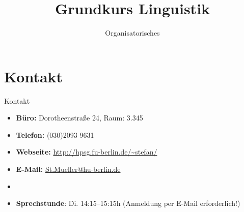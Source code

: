 
\title{Grundkurs Linguistik}

\subtitle{Organisatorisches}



\date{ }





\huberlintitlepage

	

\section{Kontakt}
%

\begin{frame}{Kontakt}

\begin{itemize}
	\item \textbf{Büro:} Dorotheenstraße 24, Raum: 3.345
	\item \textbf{Telefon:} (030)2093-9631
	\item \textbf{Webseite:} \url{http://hpsg.fu-berlin.de/~stefan/}
	\item \textbf{E-Mail:} \href{mailto:St.Mueller@hu-berlin.de}{St.Mueller@hu-berlin.de}
	\item[]
	\item \textbf{Sprechstunde}: Di. 14:15--15:15h (Anmeldung per E-Mail erforderlich!)
\end{itemize}	

\end{frame}

